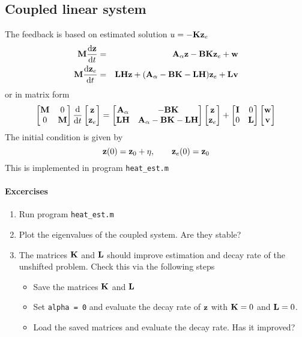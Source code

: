 \documentclass[12pt]{article}
\begin{document}
\subsection{Coupled linear system}
The feedback is based on estimated solution $u = -{\mathbf K} {\mathbf z}_e$
\begin{eqnarray*}
{\mathbf M} \frac{\textrm{d} {\mathbf z}}{\textrm{d} t} &=& {\mathbf A}_\alpha {\mathbf z} - {\mathbf B} {\mathbf K} {\mathbf z}_e + {\mathbf w} \\
{\mathbf M} \frac{\textrm{d} {\mathbf z}_e}{\textrm{d} t} &=& {\mathbf L} {\mathbf H} {\mathbf z} + ({\mathbf A}_\alpha - {\mathbf B} {\mathbf K} - {\mathbf L} {\mathbf H}) {\mathbf z}_e + {\mathbf L} {\mathbf v}
\end{eqnarray*}
or in matrix form
\[\begin{bmatrix}
   {\mathbf M} & 0\\
   0 & {\mathbf M} \\
  \end{bmatrix}
\frac{\textrm{d} }{\textrm{d} t} \begin{bmatrix}
{\mathbf z} \\
{\mathbf z}_e \end{bmatrix} = \begin{bmatrix}
{\mathbf A}_\alpha & -{\mathbf B} {\mathbf K} \\
{\mathbf L} {\mathbf H} & {\mathbf A}_\alpha - {\mathbf B} {\mathbf K} - {\mathbf L} {\mathbf H} \end{bmatrix} \begin{bmatrix}
{\mathbf z} \\ {\mathbf z}_e \end{bmatrix} + \begin{bmatrix}
{\mathbf I} & 0 \\
0 & {\mathbf L} \end{bmatrix} \begin{bmatrix}
{\mathbf w} \\ {\mathbf v} \end{bmatrix}
\]
The initial condition is given by
\[
{\mathbf z}(0) = {\mathbf z}_0 + \eta, \qquad {\mathbf z}_e(0) = {\mathbf z}_0
\]
This is implemented in program {\tt heat\_est.m}

\paragraph{Excercises}

\begin{enumerate}

\item Run program {\tt heat\_est.m}

\item Plot the eigenvalues of the coupled system. Are they stable?

\item The matrices ${\mathbf K}$ and ${\mathbf L}$ should improve estimation and decay rate of the unshifted problem. Check this via the following steps
   \begin{itemize}
    \item Save the matrices ${\mathbf K}$ and ${\mathbf L}$
    
    \item Set {\tt alpha = 0} and evaluate the decay rate of ${\mathbf z}$ with ${\mathbf K} = 0$ and ${\mathbf L}=0$. 
    
    \item Load the saved matrices and evaluate the decay rate. Has it improved?
   \end{itemize}


\end{enumerate}
\end{document}
